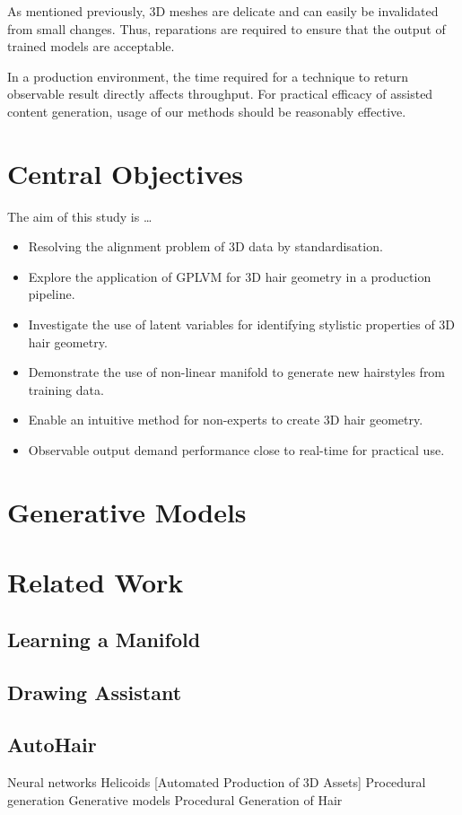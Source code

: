 \documentclass[ %
                    author={Dillon Keith Diep},
                supervisor={Dr. Carl Henrik Ek},
                    degree={MEng},
                     title={Assisted Content Generation for 3D Hair Geometry},
                  subtitle={[INCOMPLETE DRAFT, NOT FOR SUBMISSION]},
                      type={Research},
                      year={2014} ]{dissertation}
\begin{document}
As mentioned previously, 3D meshes are delicate and can easily be invalidated from small changes. Thus, reparations are required to ensure that the output of trained models are acceptable.

In a production environment, the time required for a technique to return observable result directly affects throughput. For practical efficacy of assisted content generation, usage of our methods should be reasonably effective.

\section{Central Objectives}
\noindent
The aim of this study is …
\begin{itemize}
\item Resolving the alignment problem of 3D data by standardisation.
\item Explore the application of GPLVM for 3D hair geometry in a production pipeline.
\item Investigate the use of latent variables for identifying stylistic properties of 3D hair geometry.
\item Demonstrate the use of non-linear manifold to generate new hairstyles from training data.
\item Enable an intuitive method for non-experts to create 3D hair geometry.
\item Observable output demand performance close to real-time for practical use.
\end{itemize}



\section{Generative Models}
\section{Related Work}
\subsection{Learning a Manifold}
\cite{fontmanifold}
\subsection{Drawing Assistant}
\subsection{AutoHair}
\cite{autohair}
Neural networks
Helicoids
[Automated Production of 3D Assets]
Procedural generation
Generative models
Procedural Generation of Hair 
\end{document}
